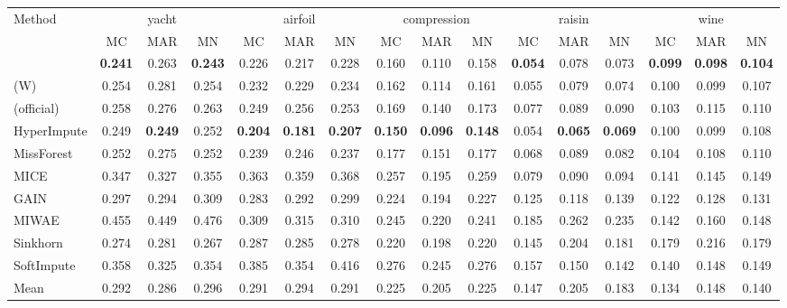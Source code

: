 \begin{tabular}{lccccccccccccccc}
\toprule
Method & \multicolumn{3}{c}{yacht} & \multicolumn{3}{c}{airfoil} & \multicolumn{3}{c}{compression} & \multicolumn{3}{c}{raisin} & \multicolumn{3}{c}{wine}\\
 & MC & MAR & MN & MC & MAR & MN & MC & MAR & MN & MC & MAR & MN & MC & MAR & MN\\
\midrule
\rmpp{} & \textbf{0.241} & 0.263 & \textbf{0.243} & 0.226 & 0.217 & 0.228 & 0.160 & 0.110 & 0.158 & \textbf{0.054} & 0.078 & 0.073 & \textbf{0.099} & \textbf{0.098} & \textbf{0.104}\\
\rmpp{} (W) & 0.254 & 0.281 & 0.254 & 0.232 & 0.229 & 0.234 & 0.162 & 0.114 & 0.161 & 0.055 & 0.079 & 0.074 & 0.100 & 0.099 & 0.107\\
\remasker{} (official) & 0.258 & 0.276 & 0.263 & 0.249 & 0.256 & 0.253 & 0.169 & 0.140 & 0.173 & 0.077 & 0.089 & 0.090 & 0.103 & 0.115 & 0.110\\
HyperImpute & 0.249 & \textbf{0.249} & 0.252 & \textbf{0.204} & \textbf{0.181} & \textbf{0.207} & \textbf{0.150} & \textbf{0.096} & \textbf{0.148} & 0.054 & \textbf{0.065} & \textbf{0.069} & 0.100 & 0.099 & 0.108\\
MissForest & 0.252 & 0.275 & 0.252 & 0.239 & 0.246 & 0.237 & 0.177 & 0.151 & 0.177 & 0.068 & 0.089 & 0.082 & 0.104 & 0.108 & 0.110\\
MICE & 0.347 & 0.327 & 0.355 & 0.363 & 0.359 & 0.368 & 0.257 & 0.195 & 0.259 & 0.079 & 0.090 & 0.094 & 0.141 & 0.145 & 0.149\\
GAIN & 0.297 & 0.294 & 0.309 & 0.283 & 0.292 & 0.299 & 0.224 & 0.194 & 0.227 & 0.125 & 0.118 & 0.139 & 0.122 & 0.128 & 0.131\\
MIWAE & 0.455 & 0.449 & 0.476 & 0.309 & 0.315 & 0.310 & 0.245 & 0.220 & 0.241 & 0.185 & 0.262 & 0.235 & 0.142 & 0.160 & 0.148\\
Sinkhorn & 0.274 & 0.281 & 0.267 & 0.287 & 0.285 & 0.278 & 0.220 & 0.198 & 0.220 & 0.145 & 0.204 & 0.181 & 0.179 & 0.216 & 0.179\\
SoftImpute & 0.358 & 0.325 & 0.354 & 0.385 & 0.354 & 0.416 & 0.276 & 0.245 & 0.276 & 0.157 & 0.150 & 0.142 & 0.140 & 0.148 & 0.149\\
Mean & 0.292 & 0.286 & 0.296 & 0.291 & 0.294 & 0.291 & 0.225 & 0.205 & 0.225 & 0.147 & 0.205 & 0.183 & 0.134 & 0.148 & 0.140\\
\bottomrule
\end{tabular}

